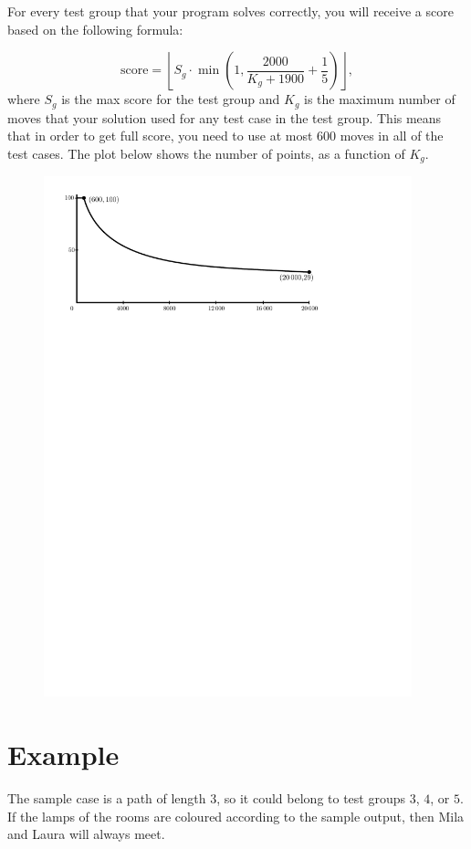For every test group that your program solves correctly, you will receive a score based on the following formula:

\[\text{score} = \left\lfloor S_g \cdot \min\left(1, \frac{2000}{K_g + 1900} + \frac15\right)\right\rfloor ,\]
where $S_g$ is the max score for the test group and $K_g$ is the maximum number of moves that your solution
used for any test case in the test group. This means that in order to get full score, you need to use at most
$600$ moves in all of the test cases. The plot below shows the number of points, as a function of $K_g$.

\begin{figure}
\centering
\includegraphics[width=0.95\textwidth]{makethemmeetplot}
\end{figure}

\section*{Example}
The sample case is a path of length $3$, so it could belong to test groups $3$, $4$, or $5$. If
the lamps of the rooms are coloured according to the sample output, then Mila and Laura will always meet.

